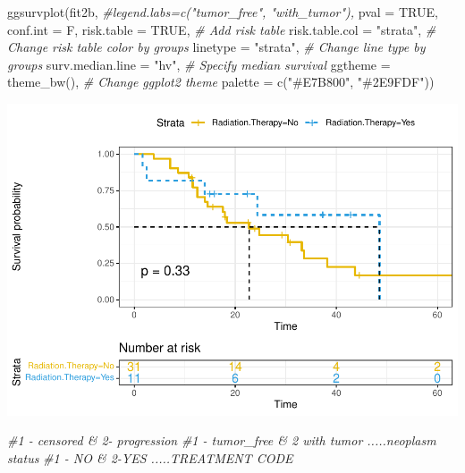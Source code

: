 \documentclass[
  11pt,
]{article}
\newenvironment{Shaded}{\begin{snugshade}}{\end{snugshade}}
\newcommand{\AttributeTok}[1]{\textcolor[rgb]{0.77,0.63,0.00}{#1}}
\newcommand{\CommentTok}[1]{\textcolor[rgb]{0.56,0.35,0.01}{\textit{#1}}}
\newcommand{\ConstantTok}[1]{\textcolor[rgb]{0.00,0.00,0.00}{#1}}
\newcommand{\FunctionTok}[1]{\textcolor[rgb]{0.00,0.00,0.00}{#1}}
\newcommand{\NormalTok}[1]{#1}
\newcommand{\StringTok}[1]{\textcolor[rgb]{0.31,0.60,0.02}{#1}}
\begin{document}
\begin{Shaded}
\begin{Highlighting}[]
\FunctionTok{ggsurvplot}\NormalTok{(fit2b,}
          \CommentTok{\#legend.labs=c("tumor\_free", "with\_tumor"),}
          \AttributeTok{pval =} \ConstantTok{TRUE}\NormalTok{, }\AttributeTok{conf.int =}\NormalTok{ F,}
          \AttributeTok{risk.table =} \ConstantTok{TRUE}\NormalTok{, }\CommentTok{\# Add risk table}
          \AttributeTok{risk.table.col =} \StringTok{"strata"}\NormalTok{, }\CommentTok{\# Change risk table color by groups}
          \AttributeTok{linetype =} \StringTok{"strata"}\NormalTok{, }\CommentTok{\# Change line type by groups}
          \AttributeTok{surv.median.line =} \StringTok{"hv"}\NormalTok{, }\CommentTok{\# Specify median survival}
          \AttributeTok{ggtheme =} \FunctionTok{theme\_bw}\NormalTok{(), }\CommentTok{\# Change ggplot2 theme}
          \AttributeTok{palette =} \FunctionTok{c}\NormalTok{(}\StringTok{"\#E7B800"}\NormalTok{, }\StringTok{"\#2E9FDF"}\NormalTok{))}
\end{Highlighting}
\end{Shaded}

\includegraphics{Random_new_surv_4_files/figure-latex/unnamed-chunk-9-1.pdf}

\begin{Shaded}
\begin{Highlighting}[]
\CommentTok{\#1 {-} censored \& 2{-} progression}
\CommentTok{\#1 {-} tumor\_free \& 2 with tumor .....neoplasm status }
\CommentTok{\#1 {-} NO \& 2{-}YES .....TREATMENT CODE}
\end{Highlighting}
\end{Shaded}
\end{document}
